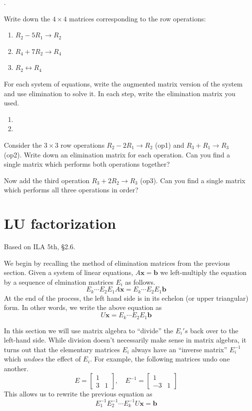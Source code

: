 \documentclass[11pt,oneside]{amsbook}
\theoremstyle{definition}
\theoremstyle{plain}
\theoremstyle{definition}
\theoremstyle{remark}
\numberwithin{equation}{section}
\numberwithin{figure}{section}
\newcounter{activityitem}
\newenvironment{activity}{\begin{list}{\arabic{activityitem}.}{\usecounter{activityitem}\setlength{\itemsep}{.2in}}}{\end{list}}
\begin{document}
\begin{activity}
  \item Write down the $4\times4$ matrices corresponding to the row operations:
    \begin{enumerate}
    \item $R_2-5R_1\rightarrow R_2$
    \item $R_4+7R_2\rightarrow R_4$
    \item $R_2\leftrightarrow R_4$
    \end{enumerate}
  \item For each system of equations, write the augmented matrix version of the system and use elimination to solve it. In each step, write the elimination matrix you used.
    \begin{enumerate}
    \item {}\vspace{.3in}
    \item {}
    \end{enumerate}
  \item Consider the $3\times3$ row operations $R_2-2R_1\rightarrow R_2$ (op1) and $R_3+R_1\rightarrow R_3$ (op2). Write down an elimination matrix for each operation. Can you find a single matrix which performs both operations together?

  Now add the third operation $R_3+2R_2\rightarrow R_3$ (op3). Can you find a single matrix which performs all three operations in order?
\end{activity}


\newpage
\section{LU factorization}

Based on ILA 5th, \S 2.6.

We begin by recalling the method of elimination matrices from the previous section. Given a system of linear equations, $A\mathbf{x}=\mathbf{b}$ we left-multiply the equation by a sequence of elmination matrices $E_i$ as follows.
\[E_k\cdots E_2E_1A\mathbf{x}=E_k\cdots E_2E_1\mathbf{b}
\]
At the end of the process, the left hand side is in its echelon (or upper triangular) form. In other words, we write the above equation as
\[U\mathbf{x}=E_k\cdots E_2E_1\mathbf{b}
\]

In this section we will use matrix algebra to ``divide'' the $E_i's$ back over to the left-hand side. While division doesn't necessarily make sense in matrix algebra, it turns out that the elementary matrices $E_i$ always have an ``inverse matrix'' $E_i^{-1}$ which \emph{undoes} the effect of $E_i$. For example, the following matrices undo one another.
\[E=\begin{bmatrix}1\\3&1\end{bmatrix},\quad
  E^{-1}=\begin{bmatrix}1\\-3&1\end{bmatrix}
\]
This allows us to rewrite the previous equation as
\[E_1^{-1}E_2^{-1}\cdots E_k^{-1}U\mathbf{x}=\mathbf{b}
\]
\end{document}
